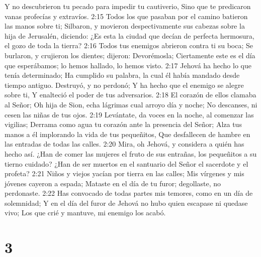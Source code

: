 Y no descubrieron tu pecado para impedir tu cautiverio,  
Sino que te predicaron vanas profecías y extravíos.  
2:15 Todos los que pasaban por el camino batieron las manos sobre ti;  
Silbaron, y movieron despectivamente sus cabezas sobre la hija de Jerusalén, diciendo:  
¿Es esta la ciudad que decían de perfecta hermosura, el gozo de toda la tierra?  
2:16 Todos tus enemigos abrieron contra ti su boca;  
Se burlaron, y crujieron los dientes; dijeron: Devorémosla;  
Ciertamente este es el día que esperábamos; lo hemos hallado, lo hemos visto.  
2:17 Jehová ha hecho lo que tenía determinado; 
Ha cumplido su palabra, la cual él había mandado desde tiempo antiguo.  
Destruyó, y no perdonó;  
Y ha hecho que el enemigo se alegre sobre ti, 
Y enalteció el poder de tus adversarios.  
2:18 El corazón de ellos clamaba al Señor;  
Oh hija de Sion, echa lágrimas cual arroyo día y noche;  
No descanses, ni cesen las niñas de tus ojos.  
2:19 Levántate, da voces en la noche, al comenzar las vigilias;  
Derrama como agua tu corazón ante la presencia del Señor;  
Alza tus manos a él implorando la vida de tus pequeñitos,  
Que desfallecen de hambre en las entradas de todas las calles.  
2:20 Mira, oh Jehová, y considera a quién has hecho así.  
¿Han de comer las mujeres el fruto de sus entrañas, los pequeñitos a su tierno cuidado?  
¿Han de ser muertos en el santuario del Señor el sacerdote y el profeta?  
2:21 Niños y viejos yacían por tierra en las calles;  
Mis vírgenes y mis jóvenes cayeron a espada;  
Mataste en el día de tu furor; degollaste, no perdonaste.  
2:22 Has convocado de todas partes mis temores, como en un día de solemnidad;  
Y en el día del furor de Jehová no hubo quien escapase ni quedase vivo;  
Los que crié y mantuve, mi enemigo los acabó.  

\chapter{3}

